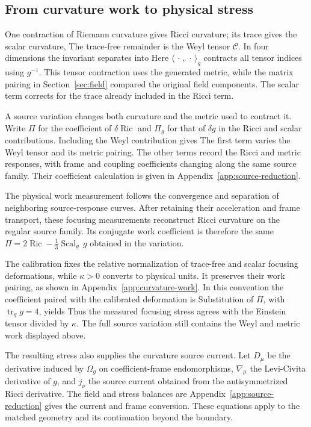 \subsection{From curvature work to physical stress}
One contraction of Riemann curvature gives Ricci curvature; its trace gives the scalar curvature,
\EnergyRicciMeaningDisplay
The trace-free remainder is the Weyl tensor $\mathcal C$. In four dimensions the invariant separates into
\NativeWeylEnergyDisplay
Here $\langle\,\cdot\,,\,\cdot\,\rangle_g$ contracts all tensor indices using $g^{-1}$. This tensor contraction uses the generated metric, while the matrix pairing in Section~\ref{sec:field} compared the original field components. The scalar term corrects for the trace already included in the Ricci term.

A source variation changes both curvature and the metric used to contract it. Write $\Pi$ for the coefficient of $\delta\operatorname{Ric}$ and $\Pi_g$ for that of $\delta g$ in the Ricci and scalar contributions. Including the Weyl contribution gives
\NativeFullWorkDisplay
The first term varies the Weyl tensor and its metric pairing. The other terms record the Ricci and metric responses, with frame and coupling coefficients changing along the same source family. Their coefficient calculation is given in Appendix~\ref{app:source-reduction}.

The physical work measurement follows the convergence and separation of neighboring source-response curves. After retaining their acceleration and frame transport, these focusing measurements reconstruct Ricci curvature on the regular source family. Its conjugate work coefficient is therefore the same $\Pi=2\operatorname{Ric}-\tfrac13\operatorname{Scal}_g\,g$ obtained in the variation.

The calibration fixes the relative normalization of trace-free and scalar focusing deformations, while $\kappa>0$ converts to physical units. It preserves their work pairing, as shown in Appendix~\ref{app:curvature-work}. In this convention the coefficient paired with the calibrated deformation is
\NativeStressExtractionDisplay
Substitution of $\Pi$, with $\operatorname{tr}_g g=4$, yields
\NativeEinsteinDisplay
Thus the measured focusing stress agrees with the Einstein tensor divided by $\kappa$. The full source variation still contains the Weyl and metric work displayed above.

The resulting stress also supplies the curvature source current. Let $D_\mu$ be the derivative induced by $\Omega_g$ on coefficient-frame endomorphisms, $\nabla_\mu$ the Levi-Civita derivative of $g$, and $j_\nu$ the source current obtained from the antisymmetrized Ricci derivative. The field and stress balances are
\NativeSourcedEquationsDisplay
Appendix~\ref{app:source-reduction} gives the current and frame conversion. These equations apply to the matched geometry and its continuation beyond the boundary.

